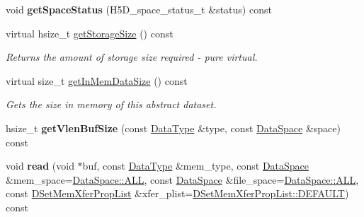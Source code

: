 \begin{DoxyCompactItemize}
void {\bfseries get\+Space\+Status} (H5\+D\+\_\+space\+\_\+status\+\_\+t \&status) const
\item 
\mbox{\label{class_h5_1_1_data_set_a7ef2ec029595abb0966cc3702466438c}} 
virtual hsize\+\_\+t \hyperlink{class_h5_1_1_data_set_a7ef2ec029595abb0966cc3702466438c}{get\+Storage\+Size} () const
\begin{DoxyCompactList}\small\item\em Returns the amount of storage size required -\/ pure virtual. \end{DoxyCompactList}\item 
\mbox{\label{class_h5_1_1_data_set_a8e1bb560e3e48dfdea3a1a96a433025e}} 
virtual size\+\_\+t \hyperlink{class_h5_1_1_data_set_a8e1bb560e3e48dfdea3a1a96a433025e}{get\+In\+Mem\+Data\+Size} () const
\begin{DoxyCompactList}\small\item\em Gets the size in memory of this abstract dataset. \end{DoxyCompactList}\item 
\mbox{\label{class_h5_1_1_data_set_a24dd2b5841d77973604190bd2d57d458}} 
hsize\+\_\+t {\bfseries get\+Vlen\+Buf\+Size} (const \hyperlink{class_h5_1_1_data_type}{Data\+Type} \&type, const \hyperlink{class_h5_1_1_data_space}{Data\+Space} \&space) const
\item 
\mbox{\label{class_h5_1_1_data_set_ae6f3866fcdc8eb6c7fbd2f6c31927616}} 
void {\bfseries read} (void $\ast$buf, const \hyperlink{class_h5_1_1_data_type}{Data\+Type} \&mem\+\_\+type, const \hyperlink{class_h5_1_1_data_space}{Data\+Space} \&mem\+\_\+space=\hyperlink{class_h5_1_1_data_space_ae8a22405edd631eb923a327d39462ff2}{Data\+Space\+::\+A\+LL}, const \hyperlink{class_h5_1_1_data_space}{Data\+Space} \&file\+\_\+space=\hyperlink{class_h5_1_1_data_space_ae8a22405edd631eb923a327d39462ff2}{Data\+Space\+::\+A\+LL}, const \hyperlink{class_h5_1_1_d_set_mem_xfer_prop_list}{D\+Set\+Mem\+Xfer\+Prop\+List} \&xfer\+\_\+plist=\hyperlink{class_h5_1_1_d_set_mem_xfer_prop_list_ae69bf0ec7bccd4bb793ffe1ff770d8c4}{D\+Set\+Mem\+Xfer\+Prop\+List\+::\+D\+E\+F\+A\+U\+LT}) const
\item 
\mbox{\label{class_h5_1_1_data_set_aedece6f602299ab2ebc9cbe1a905db42}} 

\end{DoxyCompactItemize}
